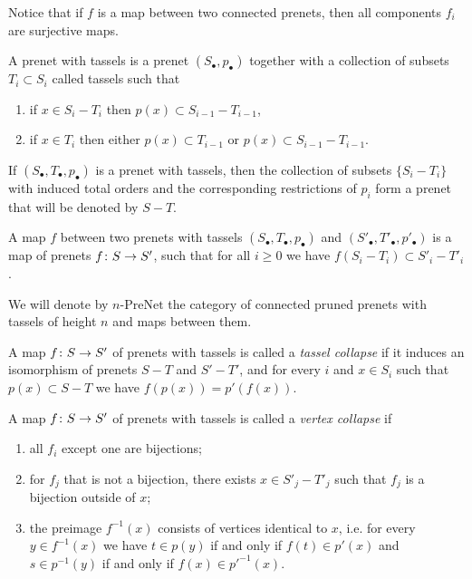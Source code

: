 \documentclass[letterpaper,12pt,leqno]{article}
\numberwithin{equation}{theorem}
\def\PreNet{\textrm{-}\mathrm{PreNet}}
\begin{document}
Notice that if $f$ is a map between two connected prenets, then all components $f_i$ are surjective maps.

\begin{definition}
A prenet with tassels is a prenet $(S_\bullet, p_\bullet)$ together with a collection of subsets $T_i \subset S_i$ called tassels such that 
\begin{enumerate}[label=\alph*)]
\item if $x \in S_i - T_i$ then $p(x) \subset S_{i-1} - T_{i-1}$,
\item if $x \in T_i$ then either $p(x) \subset T_{i-1}$ or $p(x) \subset S_{i-1} - T_{i-1}$.
\end{enumerate}
\end{definition}

\begin{lemma}
If $(S_\bullet, T_\bullet, p_\bullet)$ is a prenet with tassels, then the collection of subsets $\{S_i - T_i\}$ with induced total orders and the corresponding
restrictions of $p_i$ form a prenet that will be denoted by $S - T$.
\end{lemma}

\begin{definition}
A map $f$ between two prenets with tassels $(S_\bullet, T_\bullet, p_\bullet)$ and $(S'_\bullet, T'_\bullet, p'_\bullet)$ is a map of prenets
$f\colon S \to S'$, such that for all $i \ge 0$ we have $f(S_i - T_i) \subset S'_i - T'_i$.
\end{definition}

We will denote by $n\PreNet$ the category of connected pruned prenets with tassels of height $n$ and maps between them.

\begin{definition}
A map $f\colon S \to S'$ of prenets with tassels is called a {\em tassel collapse} if it induces an isomorphism of prenets $S - T$ and $S' - T'$, and
for every $i$ and $x \in S_i$ such that $p(x) \subset S - T$ we have $f(p(x)) = p'(f(x))$.
\end{definition}

\begin{definition}
A map $f\colon S \to S'$ of prenets with tassels is called a {\em vertex collapse} if
\begin{enumerate}[label=\alph*)]
\item all $f_i$ except one are bijections;
\item for $f_j$ that is not a bijection, there exists $x \in S'_j - T'_j$ such that $f_j$ is a bijection outside of $x$;
\item the preimage $f^{-1}(x)$ consists of vertices identical to $x$, i.e. for every $y \in f^{-1}(x)$ we have $t \in p(y)$ if and only if $f(t) \in p'(x)$ and
$s \in p^{-1}(y)$ if and only if $f(x) \in p'^{-1}(x)$.
\end{enumerate}
\end{definition}
\end{document}
